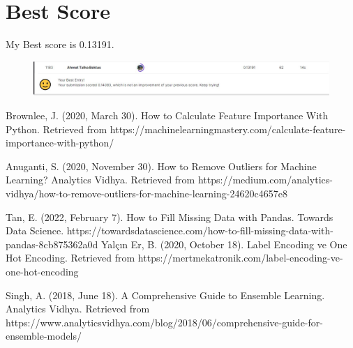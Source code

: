\section{Best Score}
My Best score is 0.13191.


\begin{figure}[H]
  \centering
  \includegraphics[width=1\textwidth]{./fig/best.jpg}
  \label{fig:corr1}
  \caption{}
\end{figure}
\newpage
\begin{thebibliography}{6}

	Brownlee, J. (2020, March 30). How to Calculate Feature Importance With Python. Retrieved from https://machinelearningmastery.com/calculate-feature-importance-with-python/
 
	Anuganti, S. (2020, November 30). How to Remove Outliers for Machine Learning? Analytics Vidhya. Retrieved from https://medium.com/analytics-vidhya/how-to-remove-outliers-for-machine-learning-24620c4657e8


		Tan, E. (2022, February 7). How to Fill Missing Data with Pandas. Towards Data Science. https://towardsdatascience.com/how-to-fill-missing-data-with-pandas-8cb875362a0d
		Yalçın Er, B. (2020, October 18). Label Encoding ve One Hot Encoding. Retrieved from https://mertmekatronik.com/label-encoding-ve-one-hot-encoding  	


		Singh, A. (2018, June 18). A Comprehensive Guide to Ensemble Learning. Analytics Vidhya. Retrieved from https://www.analyticsvidhya.com/blog/2018/06/comprehensive-guide-for-ensemble-models/
\end{thebibliography}